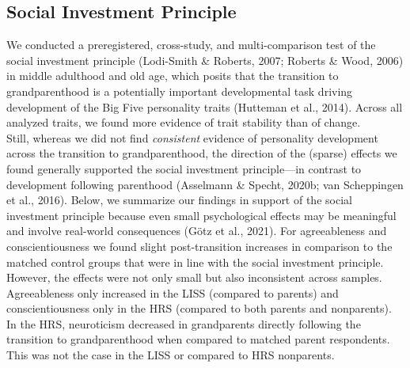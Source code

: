 \documentclass[
  english,
  man,floatsintext]{apa7}
\begin{document}
\hypertarget{social-investment-principle}{%
\subsection{Social Investment Principle}\label{social-investment-principle}}

We conducted a preregistered, cross-study, and multi-comparison test of the social investment principle (Lodi-Smith \& Roberts, 2007; Roberts \& Wood, 2006) in middle adulthood and old age, which posits that the transition to grandparenthood is a potentially important developmental task driving development of the Big Five personality traits (Hutteman et al., 2014). Across all analyzed traits, we found more evidence of trait stability than of change.\\
Still, whereas we did not find \emph{consistent} evidence of personality development across the transition to grandparenthood, the direction of the (sparse) effects we found generally supported the social investment principle---in contrast to development following parenthood (Asselmann \& Specht, 2020b; van Scheppingen et al., 2016). Below, we summarize our findings in support of the social investment principle because even small psychological effects may be meaningful and involve real-world consequences (Götz et al., 2021). For agreeableness and conscientiousness we found slight post-transition increases in comparison to the matched control groups that were in line with the social investment principle. However, the effects were not only small but also inconsistent across samples. Agreeableness only increased in the LISS (compared to parents) and conscientiousness only in the HRS (compared to both parents and nonparents). In the HRS, neuroticism decreased in grandparents directly following the transition to grandparenthood when compared to matched parent respondents. This was not the case in the LISS or compared to HRS nonparents.\\
\end{document}
